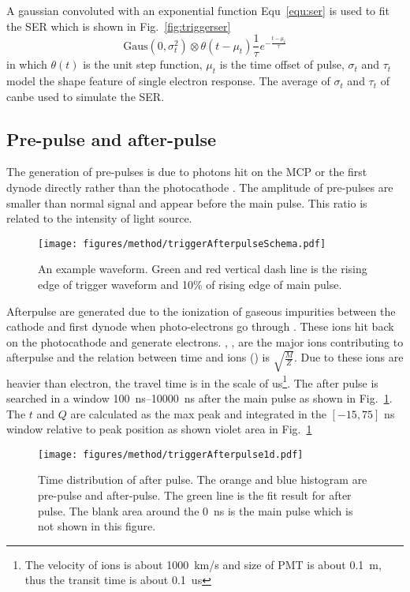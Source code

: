A gaussian convoluted with an exponential function Equ~\eqref{equ:ser} is used to fit the SER which is shown in Fig.~\ref{fig:triggerser}
\begin{equation}
    \label{equ:ser}
    \mathrm{Gaus}(0,\sigma_t^2)\otimes\theta(t-\mu_t)\frac{1}{\tau}e^{-\frac{t-\mu_t}{\tau}}
\end{equation}
in which $\theta(t)$ is the unit step function, $\mu_t$ is the time offset of pulse, $\sigma_t$ and $\tau_t$ model the shape feature of single electron response. The average of $\sigma_t$ and $\tau_t$ of canbe used to simulate the SER.

\subsection{Pre-pulse and after-pulse}
The generation of pre-pulses is due to photons hit on the MCP or the first dynode directly rather than the photocathode \cite{JUNOMassTesting}. The amplitude of pre-pulses are smaller than normal signal and appear before the main pulse. This ratio is related to the intensity of light source.
\begin{figure}
    \centering
    \texttt{[image: figures/method/triggerAfterpulseSchema.pdf]}
    \caption{An example waveform. Green and red vertical dash line is the rising edge of trigger waveform and 10\% of rising edge of main pulse.}
    \label{fig:afterpulseSchema}
\end{figure}

Afterpulse are generated due to the ionization of gaseous impurities between the cathode and first dynode when photo-electrons go through \cite{Coates_1973}. These ions hit back on the photocathode and generate electrons. , ,  are the major ions contributing to afterpulse and the relation between time and ions () is $\sqrt{\frac{M}{Z}}$\cite{Coates_1973}. Due to these ions are heavier than electron, the travel time is in the scale of \si{us}\footnote{The velocity of ions is about \SI{1000}{km/s} and size of PMT is about \SI{0.1}{m}, thus the transit time is about \SI{0.1}{us}}. The after pulse is searched in a window \SIrange{100}{10000}{ns} after the main pulse as shown in Fig.~\ref{fig:afterpulseSchema}. The $t$ and $Q$ are calculated as the max peak and integrated in the $[-15,75]$ ns window relative to peak position as shown violet area in Fig.~\ref{fig:afterpulseSchema}
\begin{figure}[!htbp]
    \centering
    \texttt{[image: figures/method/triggerAfterpulse1d.pdf]}
    \caption{Time distribution of after pulse. The orange and blue histogram are pre-pulse and after-pulse. The green line is the fit result for after pulse. The blank area around the \SI{0}{ns} is the main pulse which is not shown in this figure.}
    \label{fig:afterpulse1d}
\end{figure}

